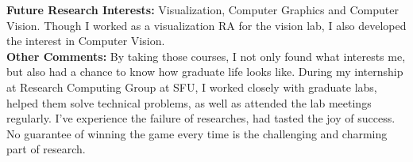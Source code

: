 \documentclass{article}
\begin{document}
{\bf Future Research Interests: } Visualization, Computer Graphics and Computer Vision. Though I worked as a visualization RA for the vision lab, I also developed the interest in Computer Vision.\\ 


{\bf Other Comments: } By taking those courses, I not only found what interests me, but also had a chance to know how graduate life looks like. During my internship at Research Computing Group at SFU, I worked closely with graduate labs, helped them solve technical problems, as well as attended the lab meetings regularly. I've experience the failure of researches, had tasted the joy of success. No guarantee of winning the game every time is the challenging and charming part of research. 
\end{document}
